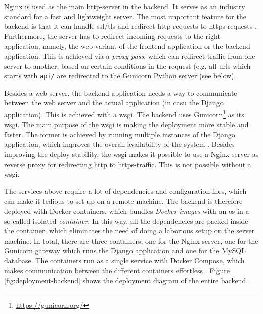 \ind Nginx is used as the main \ac{http}-server in the backend. It serves as an industry standard for a fast and lightweight server. The most important feature for the backend is that it can handle \ac{ssl}/\ac{tls} and redirect \ac{http}-requests to \ac{https}-requests \cite{nginx}. Furthermore, the server has to redirect incoming requests to the right application, namely, the web variant of the frontend application or the backend application. This is achieved via a \textit{proxy-pass}, which can redirect traffic from one server to another, based on certain conditions in the request (e.g. all \acp{url} which starts with \texttt{api/} are redirected to the Gunicorn Python server (see below).

\ind Besides a web server, the backend application needs a way to communicate between the web server and the actual application (in casu the Django application). This is achieved with a \ac{wsgi}. The backend uses Gunicorn\footnote{\url{https://gunicorn.org/}} as its \ac{wsgi}. The main purpose of the \ac{wsgi} is making the deployment more stable and faster. The former is achieved by running multiple instances of the Django application, which improves the overall availability of the system \cite{gunicorn}. Besides improving the deploy stability, the \ac{wsgi} makes it possible to use a Nginx server as reverse proxy for redirecting \ac{http} to \ac{https}-traffic. This is not possible without a \ac{wsgi}.

\ind The services above require a lot of dependencies and configuration files, which can make it tedious to set up on a remote machine. The backend is therefore deployed with Docker containers, which bundles \textit{Docker images} with an \ac{os} in a so-called isolated \textit{container}. In this way, all the dependencies are packed inside the container, which eliminates the need of doing a laborious setup on the server machine. In total, there are three containers, one for the Nginx server, one for the Gunicorn gateway which runs the Django application and one for the MySQL database. The containers run as a single service with Docker Compose, which makes communication between the different containers effortless \cite{docker-compose}. Figure \ref{fig:deployment-backend} shows the deployment diagram of the entire backend.

